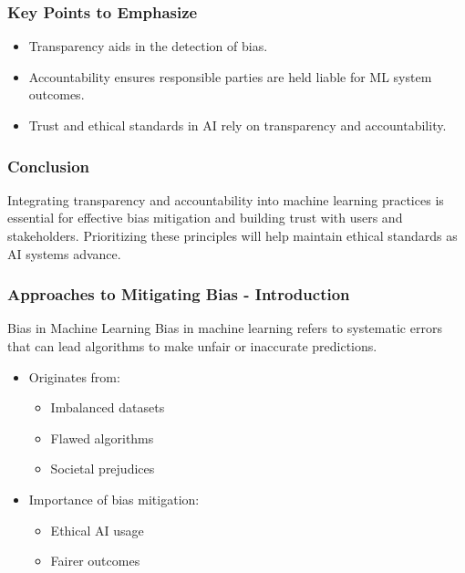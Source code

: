 \documentclass{beamer}
\begin{document}
\begin{frame}[fragile]
    \frametitle{Key Points to Emphasize}
    \begin{itemize}
        \item Transparency aids in the detection of bias.
        \item Accountability ensures responsible parties are held liable for ML system outcomes.
        \item Trust and ethical standards in AI rely on transparency and accountability.
    \end{itemize}
\end{frame}

\begin{frame}[fragile]
    \frametitle{Conclusion}
    Integrating transparency and accountability into machine learning practices is essential for effective bias mitigation and building trust with users and stakeholders. Prioritizing these principles will help maintain ethical standards as AI systems advance.
\end{frame}

\begin{frame}[fragile]
    \frametitle{Approaches to Mitigating Bias - Introduction}
    \begin{block}{Bias in Machine Learning}
        Bias in machine learning refers to systematic errors that can lead algorithms to make unfair or inaccurate predictions. 
    \end{block}
    \begin{itemize}
        \item Originates from:
        \begin{itemize}
            \item Imbalanced datasets
            \item Flawed algorithms
            \item Societal prejudices
        \end{itemize}
        \item Importance of bias mitigation:
        \begin{itemize}
            \item Ethical AI usage
            \item Fairer outcomes
        \end{itemize}
    \end{itemize}
\end{frame}
\end{document}

